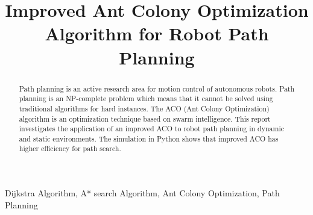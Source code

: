 \documentclass[conference]{IEEEtran}
\begin{document}
\title{Improved Ant Colony Optimization Algorithm for Robot Path Planning }

    
\author{
\and
{}
\and
{}
}

\maketitle

\begin{abstract}
Path planning is an active research area for motion control of autonomous robots. Path planning is an NP-complete problem which means that it cannot be solved using traditional algorithms for hard instances. The ACO (Ant Colony Optimization) algorithm is an optimization technique based on swarm intelligence. This report investigates the application of an improved ACO to robot path planning in dynamic and static environments. The simulation in Python shows that improved ACO has higher efficiency for path search.
\end{abstract}

\begin{IEEEkeywords}
Dijkstra Algorithm, A* search Algorithm, Ant Colony Optimization, Path Planning 
\end{IEEEkeywords}
\end{document}
